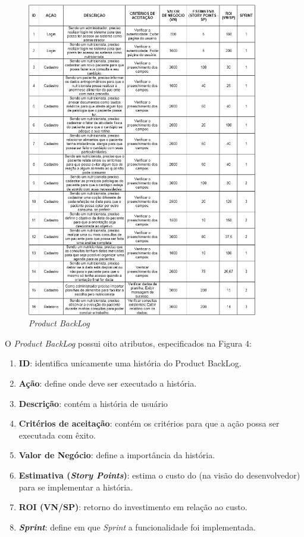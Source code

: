 \documentclass[
	12pt,				%
    oneside,			%
	a4paper,			%
	english,			%
	french,				%
	spanish,			%
	brazil,				%
	]{abntex2}
\begin{document}
\begin{figure} [hbt] 
\label{table1} 
\caption{\textit{Product BackLog}}
\begin{center}
\includegraphics[width=0.90\textwidth]{table.jpg}
\end{center}
\end{figure}

O \textit{Product BackLog} possui oito atributos, especificados na Figura 4:

\begin{enumerate}

\item \textbf{ID}: identifica unicamente uma história do Product BackLog.
\item \textbf{Ação}: define onde deve ser executado a história.
\item \textbf{Descrição}: contém a história de usuário
\item \textbf{Critérios de aceitação}: contém os critérios para que a ação possa ser
executada com êxito.
\item \textbf{Valor de Negócio}: define a importância da história.
\item \textbf{Estimativa (\textit{Story Points})}: estima o custo do (na visão do desenvolvedor)
para se implementar a história.
\item \textbf{ROI (VN/SP)}: retorno do investimento em relação ao custo.
\item \textbf{\textit{Sprint}}: define em que \textit{Sprint} a funcionalidade foi implementada.

\end{enumerate}
\end{document}
